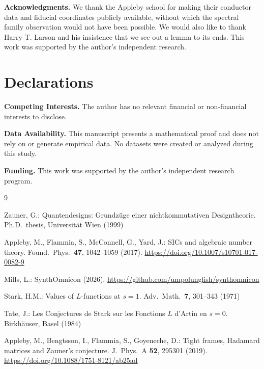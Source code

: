 \documentclass[12pt]{article}
\theoremstyle{plain}
\theoremstyle{definition}
\theoremstyle{remark}
\begin{document}
\vspace{1em}
\noindent\textbf{Acknowledgments.} We thank the Appleby school for making their conductor data and fiducial coordinates publicly available, without which the spectral family observation would not have been possible. We would also like to thank Harry T. Larson and his insistence that we see out a lemma to its ends. This work was supported by the author's independent research.

\section*{Declarations}

\noindent\textbf{Competing Interests.} The author has no relevant financial or non-financial interests to disclose.

\noindent\textbf{Data Availability.} This manuscript presents a mathematical proof and does not rely on or generate empirical data. No datasets were created or analyzed during this study.

\noindent\textbf{Funding.} This work was supported by the author's independent research program.

\begin{thebibliography}{9}

Zauner, G.: Quantendesigns: Grundz\"uge einer nichtkommutativen Designtheorie. Ph.D.\ thesis, Universit\"at Wien (1999)

Appleby, M., Flammia, S., McConnell, G., Yard, J.: SICs and algebraic number theory. Found.\ Phys.\ \textbf{47}, 1042--1059 (2017). \url{https://doi.org/10.1007/s10701-017-0082-9}

Mills, L.: SynthOmnicon (2026). \url{https://github.com/umpolungfish/synthomnicon}

Stark, H.M.: Values of $L$-functions at $s=1$. Adv.\ Math.\ \textbf{7}, 301--343 (1971)

Tate, J.: Les Conjectures de Stark sur les Fonctions $L$ d'Artin en $s=0$. Birkh\"auser, Basel (1984)

Appleby, M., Bengtsson, I., Flammia, S., Goyeneche, D.: Tight frames, Hadamard matrices and Zauner's conjecture. J.\ Phys.\ A \textbf{52}, 295301 (2019). \url{https://doi.org/10.1088/1751-8121/ab25ad}

\end{thebibliography}
\end{document}
